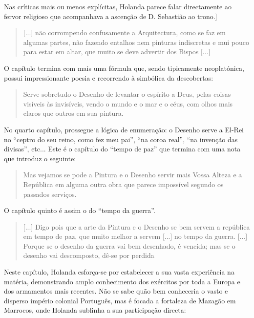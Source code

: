 \documentclass{article}
\begin{document}
Nas críticas mais ou menos explícitas, Holanda parece falar
directamente ao fervor religioso que acompanhava a ascenção de
D. Sebastião ao trono.]\cite[fl.38r]{holanda}

\begin{quote}
  [...] não corrompendo confusamente a Arquitectura, como se faz em
  algumas partes, não fazendo entalhos nem pinturas indiscretas e mui
  pouco para estar em altar, que muito se deve advertir dos Bispos
  [...] 
\end{quote}

O capítulo termina com mais uma fórmula que, sendo tipicamente
neoplatónica, possui impressionante poesia e recorrendo à simbólica da
descobertas:

\begin{quote}
  Serve sobretudo o Desenho de levantar o espírito a Deus, pelas
  coisas visíveis às invisíveis, vendo o mundo e o mar e o céus, com
  olhos mais claros que outros em sua pintura.
\end{quote}

No quarto capítulo, prossegue a lógica de enumeração: o Desenho serve
a El-Rei no ``ceptro do seu reino, como fez meu pai'', ``na coroa
real'', ``na invenção das divisas'', etc... Este é o capítulo do
``tempo de paz'' que termina com uma nota que introduz o
seguinte:\cite[fl.41v]{holanda}

\begin{quote}
  Mas vejamos se pode a Pintura e o Desenho servir mais Vossa Alteza e
  a República em alguma outra obra que parece impossível segundo os
  passados serviços.
\end{quote}

O capítulo quinto é assim o do ``tempo da
guerra''.\cite[fl.42r]{holanda}

\begin{quote}
  [...] Digo pois que a arte da Pintura e o Desenho se bem servem a
  república em tempo de paz, que muito melhor a servem [...] no tempo
  da guerra. [...] Porque se o desenho da guerra vai bem desenhado, é
  vencida; mas se o desenho vai descomposto, dê-se por perdida
\end{quote}

Neste capítulo, Holanda esforça-se por estabelecer a sua vasta
experiência na matéria, demonstrando amplo conhecimento dos exércitos
por toda a Europa e dos armamentos mais recentes. Não se sabe quão bem
conheceria o vasto e disperso império colonial Português, mas é focada
a fortaleza de Mazagão em Marrocos, onde Holanda sublinha a sua
participação directa:
\end{document}

